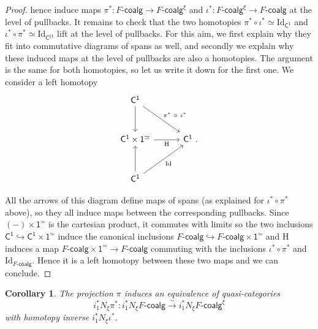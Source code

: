 \documentclass{proc-l}
\theoremstyle{plain}
\newtheorem{corollary}[{theorem}]{Corollary}
\theoremstyle{definition}
\theoremstyle{remark}
\begin{document}
\begin{proof}
hence induce maps $\pi^*:F\text{-}\mathsf{coalg}\longrightarrow F\text{-}\mathsf{coalg}^{\xi}$ and $\iota^*:F\text{-}\mathsf{coalg}^{\xi}\longrightarrow F\text{-}\mathsf{coalg}$ at the level of pullbacks. It remains to check that the two homotopies $\pi^*\circ\iota^*\simeq \mathrm{Id}_{\mathsf{C}^{\mathsf{1}}}$ and $\iota^*\circ\pi^*\simeq \mathrm{Id}_{\mathsf{C}^{\xi\mathsf{1}}}$ lift at the level of pullbacks. For this aim, we first explain why they fit into commutative diagrams of spans as well, and secondly we explain why these induced maps at the level of pullbacks are also a homotopies. The argument is the same for both homotopies, so let us write it down for the first one. We consider a left homotopy
\[
\begin{tikzcd}[column sep=2.5pc,row sep=2.5pc]
\mathsf{C}^{\mathsf{1}}
\arrow[d]
\arrow[dr, "\pi^*~ \circ ~ \iota^*"]
& \\
\mathsf{C}^{\mathsf{1}} \times \mathsf{1}^{\simeq}
\arrow[r, "\mathrm{H}"']
& \mathsf{C}^{\mathsf{1}}~.\\
\mathsf{C}^{\mathsf{1}}
\arrow[u]
\arrow[ur, "\mathrm{Id}"']
&
\end{tikzcd}
\]

All the arrows of this diagram define maps of spans (as explained for $\iota^*\circ\pi^*$ above), so they all induce maps between the corresponding pullbacks. Since $(-) \times\mathsf{1}^{\simeq}$ is the cartesian product, it commutes with limits so the two inclusions $\mathsf{C}^{\mathsf{1}}\hookrightarrow \mathsf{C}^{\mathsf{1}}\times \mathsf{1}^{\simeq}$ induce the canonical inclusions $F\text{-}\mathsf{coalg}\hookrightarrow F\text{-}\mathsf{coalg}\times\mathsf{1}^{\simeq}$ and $\mathrm{H}$ induces a map $F\text{-}\mathsf{coalg}\times\mathsf{1}^{\simeq}\longrightarrow F\text{-}\mathsf{coalg}$ commuting with the inclusions $\iota^*\circ\pi^*$ and $\mathrm{Id}_{F\text{-}\mathsf{coalg}}$. Hence it is a left homotopy between these two maps and we can conclude.
\end{proof}

\begin{corollary}%
\label{Corollary:4.8}\label{cor:piquasicateq}
The projection $\pi$ induces an equivalence of quasi-categories
\[
i_1^*N_{\xi}\pi^*:i_1^*N_{\xi}F\text{-}\mathsf{coalg}\stackrel{\sim}{\rightarrow}i_1^*N_{\xi}F\text{-}\mathsf{coalg}^{\xi}
\]
with homotopy inverse $i_1^*N_{\xi}\iota^*$.
\end{corollary}
\end{document}
